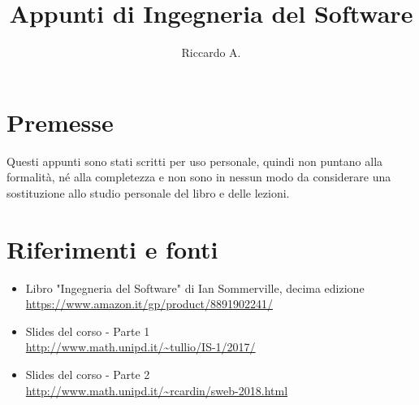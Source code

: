 

\author{Riccardo A.}
\title{Appunti di Ingegneria del Software}



\maketitle

\section*{Premesse}
Questi appunti sono stati scritti per uso personale, quindi non puntano alla formalità, né alla completezza e non sono in nessun modo da considerare una sostituzione allo studio personale del libro e delle lezioni. 

\section*{Riferimenti e fonti}
\begin{itemize}
\item Libro "Ingegneria del Software" di Ian Sommerville, decima edizione\\
\url{https://www.amazon.it/gp/product/8891902241/}
\item Slides del corso - Parte 1 \\
\url{http://www.math.unipd.it/~tullio/IS-1/2017/}
\item Slides del corso - Parte 2 \\
\url{http://www.math.unipd.it/~rcardin/sweb-2018.html}
\end{itemize}

\tableofcontents



